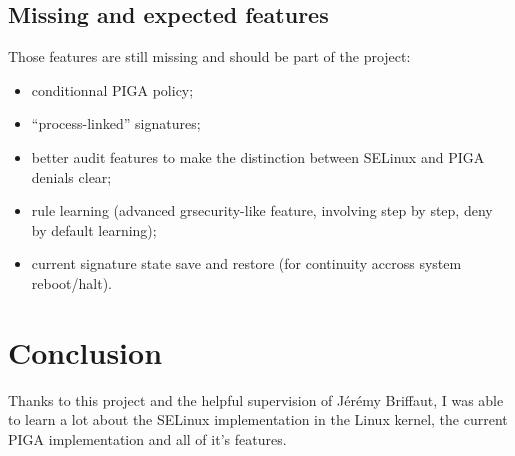 \documentclass[pdftex,a4paper,titlepage,11pt]{article}
\begin{document}
\subsection{Missing and expected features}

Those features are still missing and should be part of the project:

\begin{itemize}
	\item conditionnal PIGA policy;
	\item ``process-linked'' signatures;
	\item better audit features to make the distinction between SELinux and PIGA
denials clear;
	\item rule learning (advanced grsecurity-like feature, involving step by
step, deny by default learning);
	\item current signature state save and restore (for continuity accross
system reboot/halt).
\end{itemize}

\newpage

\section*{Conclusion} 

Thanks to this project and the helpful supervision of Jérémy Briffaut, I was
able to learn a lot about the SELinux implementation in the Linux kernel, the
current PIGA implementation and all of it's features.


\newpage

\end{document}
